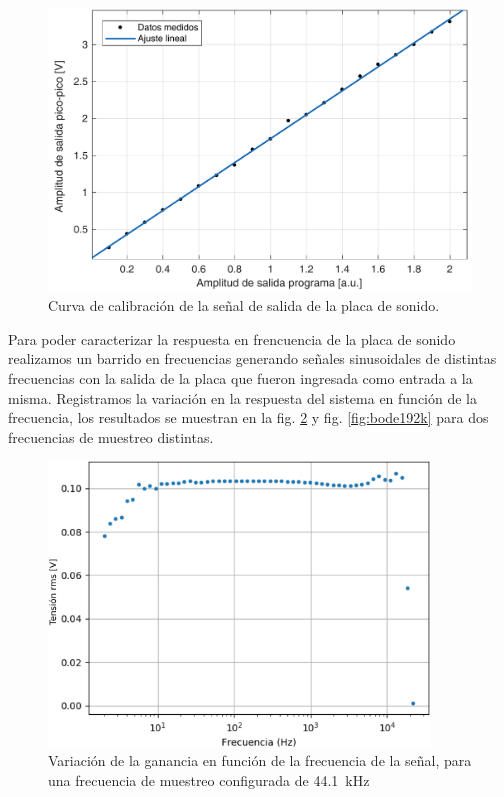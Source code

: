 \documentclass[a4paper,11pt]{article}
\begin{document}
	\begin{figure}[!h]
		\centering
		\includegraphics[width=\textwidth]{imagenes/CalibracionSalida.pdf}
		\caption{Curva de calibración de la señal de salida de la placa
de sonido.}
        \label{fig:CalibracionSalida}
	\end{figure}

Para poder caracterizar la respuesta en frencuencia de la placa de
sonido realizamos un barrido en frecuencias generando señales
sinusoidales de distintas frecuencias con la salida de la placa que
fueron ingresada como entrada a la misma. Registramos la variación en la
respuesta del sistema en función de la frecuencia, los resultados se
muestran en la fig. \ref{fig:bode44k1} y fig. \ref{fig:bode192k}
para dos frecuencias de muestreo distintas.

	\begin{figure}[!h]
		\centering
		\includegraphics[width=0.9\textwidth]{imagenes/bode44k1Hz.png}
		\caption{Variación de la ganancia en función de la frecuencia de
la señal, para una frecuencia de muestreo configurada de \SI{44.1}{\kHz}}
        \label{fig:bode44k1}
	\end{figure}
\end{document}
